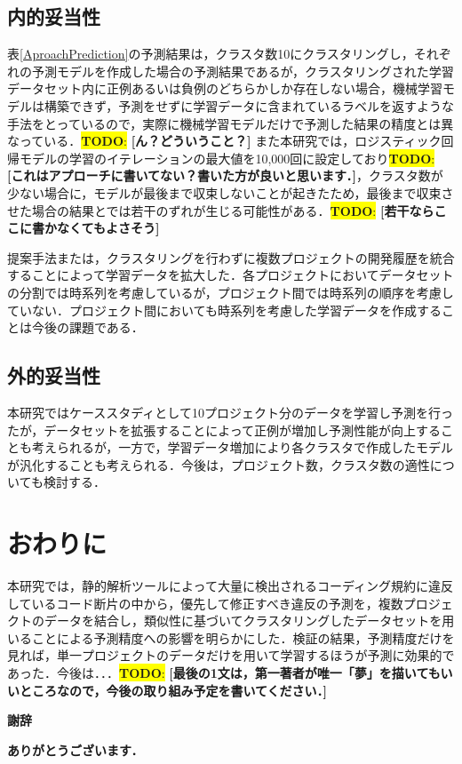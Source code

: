\documentclass[T,J]{fose} %
\newcommand{\todo}[1]{\colorbox{yellow}{{\bf TODO}:}{\color{red} {\textbf{[#1]}}}}
\begin{document}
\subsection{内的妥当性}
表\ref{AproachPrediction}の予測結果は，クラスタ数10にクラスタリングし，それぞれの予測モデルを作成した場合の予測結果であるが，クラスタリングされた学習データセット内に正例あるいは負例のどちらかしか存在しない場合，機械学習モデルは構築できず，予測をせずに学習データに含まれているラベルを返すような手法をとっているので，実際に機械学習モデルだけで予測した結果の精度とは異なっている．\todo{ん？どういうこと？}
また本研究では，ロジスティック回帰モデルの学習のイテレーションの最大値を10,000回に設定しており\todo{これはアプローチに書いてない？書いた方が良いと思います．}，クラスタ数が少ない場合に，モデルが最後まで収束しないことが起きたため，最後まで収束させた場合の結果とでは若干のずれが生じる可能性がある．\todo{若干ならここに書かなくてもよさそう}

提案手法または，クラスタリングを行わずに複数プロジェクトの開発履歴を統合することによって学習データを拡大した．各プロジェクトにおいてデータセットの分割では時系列を考慮しているが，プロジェクト間では時系列の順序を考慮していない．プロジェクト間においても時系列を考慮した学習データを作成することは今後の課題である．



\subsection{外的妥当性}
本研究ではケーススタディとして10プロジェクト分のデータを学習し予測を行ったが，データセットを拡張することによって正例が増加し予測性能が向上することも考えられるが，一方で，学習データ増加により各クラスタで作成したモデルが汎化することも考えられる．今後は，プロジェクト数，クラスタ数の適性についても検討する．


\section{おわりに}\label{sec:end}
本研究では，静的解析ツールによって大量に検出されるコーディング規約に違反しているコード断片の中から，優先して修正すべき違反の予測を，複数プロジェクトのデータを結合し，類似性に基づいてクラスタリングしたデータセットを用いることによる予測精度への影響を明らかにした．検証の結果，予測精度だけを見れば，単一プロジェクトのデータだけを用いて学習するほうが予測に効果的であった．今後は．．．\todo{最後の1文は，第一著者が唯一「夢」を描いてもいいところなので，今後の取り組み予定を書いてください．}

\textbf{謝辞}\

\textbf{ありがとうございます．}




\end{document}
